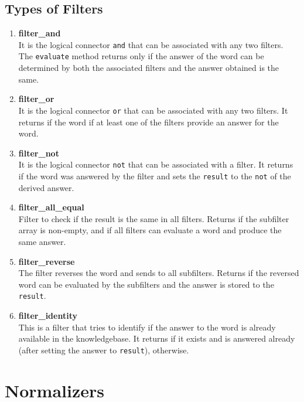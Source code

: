 \subsection{Types of Filters}
\begin{enumerate}
 
\item \textbf{filter\_and} \\
It is the logical connector \texttt{and} that can be associated with any two filters. The \texttt{evaluate} method returns \true only if the answer of the word can be determined by both the associated filters and the answer obtained is the same.

\item \textbf{filter\_or}  \\
It is the logical connector \texttt{or} that can be associated with any two filters. It returns \true if the word if at least one of the filters provide an answer for the word.

\item \textbf{filter\_not} \\
It is the logical connector \texttt{not} that can be associated with a filter. It returns \true if the word was answered by the filter and sets the \texttt{result} to the \texttt{not} of the derived answer.

\item \textbf{filter\_all\_equal} \\
Filter to check if the result is the same in all filters. Returns \true if the subfilter array is non-empty, and if all filters can evaluate a word and produce the same answer. 

\item \textbf{filter\_reverse} \\
The filter reverses the word and sends to all subfilters. Returns \true if the reversed word can be evaluated by the subfilters and the answer is stored to the \texttt{result}.

\item \textbf{filter\_identity} \\
This is a filter that tries to identify if the answer to the word is already available in the knowledgebase. It returns \true if it exists and is answered already (after setting the answer to \texttt{result}), \false otherwise.

\end{enumerate}

\section{Normalizers}

